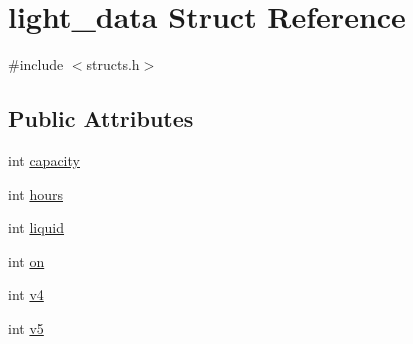 \hypertarget{structlight__data}{\section{light\-\_\-data Struct Reference}
\label{structlight__data}
}


{\ttfamily \#include $<$structs.\-h$>$}

\subsection*{Public Attributes}
\begin{DoxyCompactItemize}
\item 
int \hyperlink{structlight__data_a8bc24a597cb860b3a0891a8f0f6e6bd9}{capacity}
\item 
int \hyperlink{structlight__data_a8679878a7afcc7278d2bf0a0d7b5e35d}{hours}
\item 
int \hyperlink{structlight__data_a789bceba8c793e1f731b12fb420c473c}{liquid}
\item 
int \hyperlink{structlight__data_a3936b36b705f11be6ac709b90b720e58}{on}
\item 
int \hyperlink{structlight__data_ab48231ec90350c1e7156e54a121be518}{v4}
\item 
int \hyperlink{structlight__data_a3deebe2d242690fa0e5963ba96236475}{v5}
\end{DoxyCompactItemize}


